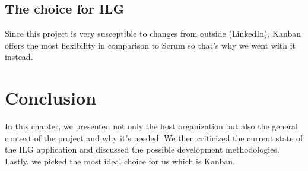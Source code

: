 \subsection{The choice for ILG}
Since this project is very susceptible to changes from outside (LinkedIn), Kanban offers the most flexibility in comparison to Scrum so that’s why we went with it instead.

\setcounter{secnumdepth}{0} %
\section{Conclusion}
In this chapter, we presented not only the host organization but also the general context of the project and why it's needed.
We then criticized the current state of the ILG application and discussed the possible development methodologies.
Lastly, we picked the most ideal choice for us which is Kanban.
